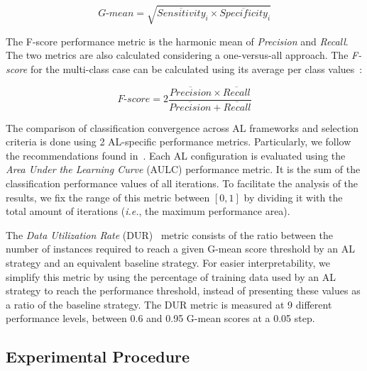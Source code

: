 \begin{equation*}
    \textit{G-mean} = \sqrt{\overline{Sensitivity}_i \times
    \overline{Specificity}_i}
\end{equation*}

The F-score performance metric is the harmonic mean of \textit{Precision} and
\textit{Recall}. The two metrics are also calculated considering a
one-versus-all approach. The \textit{F-score} for the multi-class case can be
calculated using its average per class values~\cite{He2009}:

\begin{equation*}
    \textit{F-score}=2\frac{\overline{Precision} \times
    \overline{Recall}}{\overline{Precision} + \overline{Recall}}
\end{equation*}
 
The comparison of classification convergence across AL frameworks and
selection criteria is done using 2 AL-specific performance metrics.
Particularly, we follow the recommendations found in~\cite{Kottke2017}. Each
AL configuration is evaluated using the \textit{Area Under the Learning Curve}
(AULC) performance metric. It is the sum of the classification performance
values of all iterations. To facilitate the analysis of the results, we fix
the range of this metric between $[0,1]$ by dividing it with the total amount
of iterations (\textit{i.e.}, the maximum performance area). 

The \textit{Data Utilization Rate} (DUR)~\cite{Reitmaier2013} metric consists
of the ratio between the number of instances required to reach a given G-mean
score threshold by an AL strategy and an equivalent baseline strategy. For
easier interpretability, we simplify this metric by using the percentage
of training data used by an AL strategy to reach the performance threshold,
instead of presenting these values as a ratio of the baseline strategy. The
DUR metric is measured at 9 different performance levels, between
0.6 and 0.95 G-mean scores at a 0.05 step.

\subsection{Experimental Procedure}~\label{sec:experimental_procedure-al-generator}

